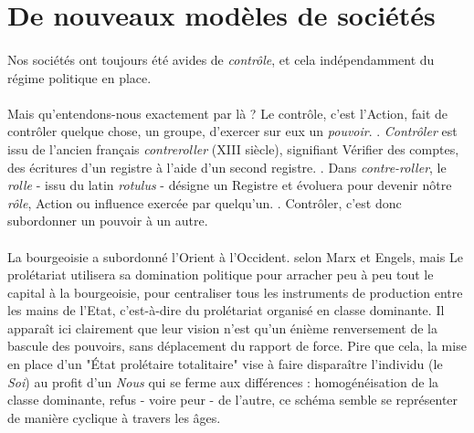 \section{De nouveaux modèles de sociétés}

\paragraph{} Nos sociétés ont toujours été avides de \emph{contrôle}, et cela indépendamment du régime politique en 
place. 

\paragraph{} Mais qu'entendons-nous exactement par là ? Le contrôle, c'est l'\guillemotleft Action, fait de contrôler
quelque chose, un groupe, d'exercer sur eux un \emph{pouvoir}. \guillemotright. \cite{Controle0} \emph{Contrôler} est
issu de l'ancien français \emph{contreroller} (XIII siècle), signifiant \guillemotleft Vérifier des comptes, des
écritures d'un registre à l'aide d'un second registre. \guillemotright. \cite{Controle1} Dans \emph{contre-roller}, le 
\emph{rolle} - issu du latin \emph{rotulus} - désigne un \guillemotleft Registre \guillemotright et évoluera pour devenir
nôtre \emph{rôle}, \guillemotleft Action ou influence exercée par quelqu'un. \guillemotright. Contrôler, c'est donc
subordonner un pouvoir à un autre.

\paragraph{} \guillemotleft La bourgeoisie a subordonné l'Orient à l'Occident. \guillemotright selon Marx et Engels,
mais \guillemotleft Le prolétariat utilisera sa domination politique pour arracher peu à peu tout le capital à la
bourgeoisie, pour centraliser tous les instruments de production entre les mains de l'Etat, c'est-à-dire du prolétariat
organisé en classe dominante.\guillemotright \cite{Marx1} Il apparaît ici clairement que leur vision
n'est qu'un énième renversement de la bascule des pouvoirs, sans déplacement du rapport de force. Pire que cela, la mise
en place d'un "État prolétaire totalitaire" vise à faire disparaître l'individu (le \emph{Soi}) au profit d'un \emph{Nous}
qui se ferme aux différences : homogénéisation de la classe dominante, refus - voire peur - de l'autre, ce schéma semble
se représenter de manière cyclique à travers les âges.

